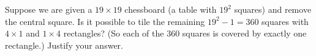 Suppose we are given a $19 \times 19$ chessboard (a table with $19^2$ squares)
and remove the central square. Is it possible to tile the remaining $19^2 - 1 =
360$ squares with $4 \times 1$ and $1 \times 4$ rectangles? (So each of the 360
squares is covered by exactly one rectangle.) Justify your answer.
